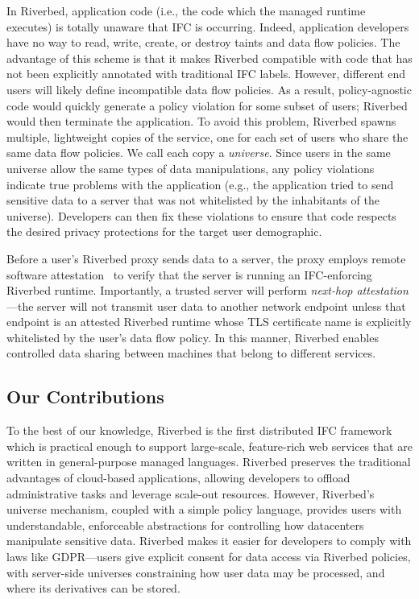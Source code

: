 In Riverbed, application code (i.e., the code which the
managed runtime executes) is totally unaware that IFC
is occurring. Indeed, application developers have no way
to read, write, create, or destroy taints and data flow
policies. The advantage of this scheme is that it makes
Riverbed compatible with code that has not been explicitly
annotated with traditional IFC labels. However, different
end users will likely define incompatible data flow policies.
As a result, policy-agnostic code would quickly generate a
policy violation for some subset of users; Riverbed would
then terminate the application. To avoid this problem,
Riverbed spawns multiple, lightweight copies of the service,
one for each set of users who share the same data flow policies.
We call each copy a \textit{universe}. Since users in the
same universe allow the same types of data manipulations,
any policy violations indicate true problems with the
application (e.g., the application tried to send sensitive
data to a server that was not whitelisted by the inhabitants
of the universe). Developers can then fix these violations
to ensure that code respects the desired privacy protections
for the target user demographic.

Before a user's Riverbed proxy sends data to a server, the
proxy employs remote software attestation~\cite{remoteAttestation}
to verify that the server is running an IFC-enforcing Riverbed
runtime. Importantly, a trusted server will perform \textit{next-hop
	attestation}---the server will not transmit user data to
another network endpoint unless that endpoint is an
attested Riverbed runtime whose TLS certificate name is
explicitly whitelisted by the user's data flow policy.
In this manner, Riverbed enables controlled data sharing
between machines that belong to different services.

\subsection{Our Contributions}
To the best of our knowledge, Riverbed is the first distributed
IFC framework which is practical enough to support large-scale,
feature-rich web services that are written in general-purpose
managed languages. Riverbed preserves the traditional advantages
of cloud-based applications, allowing developers to offload
administrative tasks and leverage scale-out resources. However,
Riverbed's universe mechanism, coupled with a simple policy language,
provides users with understandable, enforceable abstractions
for controlling how datacenters manipulate sensitive data.
Riverbed makes it easier for developers to comply with laws like
GDPR---users give explicit consent for data access via Riverbed
policies, with server-side universes constraining how
user data may be processed, and where its derivatives can
be stored.

